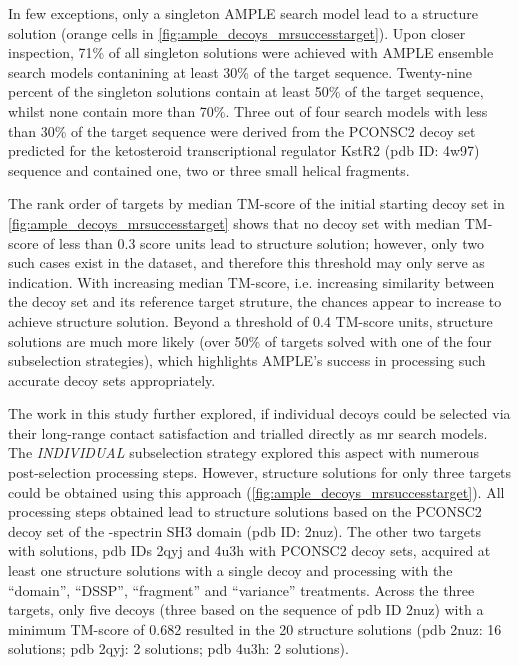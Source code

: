 In few exceptions, only a singleton AMPLE search model lead to a structure solution (orange cells in \cref{fig:ample_decoys_mrsuccesstarget}). Upon closer inspection, 71\% of all singleton solutions were achieved with AMPLE ensemble search models contanining at least 30\% of the target sequence. Twenty-nine percent of the singleton solutions contain at least 50\% of the target sequence, whilst none contain more than 70\%. Three out of four search models with less than 30\% of the target sequence were derived from the PCONSC2 decoy set predicted for the ketosteroid transcriptional regulator KstR2 (\gls{pdb} ID: 4w97) sequence and contained one, two or three small helical fragments.  

The rank order of targets by median TM-score of the initial starting decoy set in \cref{fig:ample_decoys_mrsuccesstarget} shows that no decoy set with median TM-score of less than 0.3 score units lead to structure solution; however, only two such cases exist in the dataset, and therefore this threshold may only serve as indication. With increasing median TM-score, i.e. increasing similarity between the decoy set and its reference target struture, the chances appear to increase to achieve structure solution. Beyond a threshold of 0.4 TM-score units, structure solutions are much more likely (over 50\% of targets solved with one of the four subselection strategies), which highlights AMPLE's success in processing such accurate decoy sets appropriately.

The work in this study further explored, if individual decoys could be selected via their long-range contact satisfaction and trialled directly as \gls{mr} search models. The \textit{INDIVIDUAL} subselection strategy explored this aspect with numerous post-selection processing steps. However, structure solutions for only three targets could be obtained using this approach (\cref{fig:ample_decoys_mrsuccesstarget}). All processing steps obtained lead to structure solutions based on the PCONSC2 decoy set of the \textalpha-spectrin SH3 domain (\gls{pdb} ID: 2nuz). The other two targets with solutions, \gls{pdb} IDs 2qyj and 4u3h with PCONSC2 decoy sets, acquired at least one structure solutions with a single decoy and processing with the ``domain'', ``DSSP'', ``fragment'' and ``variance'' treatments. Across the three targets, only five decoys (three based on the sequence of \gls{pdb} ID 2nuz) with a minimum TM-score of 0.682 resulted in the 20 structure solutions (\gls{pdb} 2nuz: 16 solutions; \gls{pdb} 2qyj: 2 solutions; \gls{pdb} 4u3h: 2 solutions).

